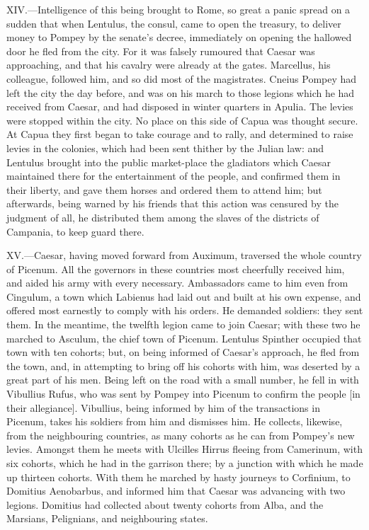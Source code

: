 XIV.—Intelligence of this being brought to Rome, so great a panic
spread on a sudden that when Lentulus, the consul, came to open the
treasury, to deliver money to Pompey by the senate's decree, immediately
on opening the hallowed door he fled from the city. For it was falsely
rumoured that Caesar was approaching, and that his cavalry were already
at the gates. Marcellus, his colleague, followed him, and so did most of
the magistrates. Cneius Pompey had left the city the day before, and was
on his march to those legions which he had received from Caesar, and had
disposed in winter quarters in Apulia. The levies were stopped within
the city. No place on this side of Capua was thought secure. At Capua
they first began to take courage and to rally, and determined to raise
levies in the colonies, which had been sent thither by the Julian law:
and Lentulus brought into the public market-place the gladiators which
Caesar maintained there for the entertainment of the people, and
confirmed them in their liberty, and gave them horses and ordered them
to attend him; but afterwards, being warned by his friends that this
action was censured by the judgment of all, he distributed them among
the slaves of the districts of Campania, to keep guard there.

XV.—Caesar, having moved forward from Auximum, traversed the whole
country of Picenum. All the governors in these countries most cheerfully
received him, and aided his army with every necessary. Ambassadors came
to him even from Cingulum, a town which Labienus had laid out and built
at his own expense, and offered most earnestly to comply with his
orders. He demanded soldiers: they sent them. In the meantime, the
twelfth legion came to join Caesar; with these two he marched to
Asculum, the chief town of Picenum. Lentulus Spinther occupied that town
with ten cohorts; but, on being informed of Caesar's approach, he fled
from the town, and, in attempting to bring off his cohorts with him, was
deserted by a great part of his men. Being left on the road with a small
number, he fell in with Vibullius Rufus, who was sent by Pompey into
Picenum to confirm the people [in their allegiance]. Vibullius, being
informed by him of the transactions in Picenum, takes his soldiers from
him and dismisses him. He collects, likewise, from the neighbouring
countries, as many cohorts as he can from Pompey's new levies. Amongst
them he meets with Ulcilles Hirrus fleeing from Camerinum, with six
cohorts, which he had in the garrison there; by a junction with which he
made up thirteen cohorts. With them he marched by hasty journeys to
Corfinium, to Domitius Aenobarbus, and informed him that Caesar was
advancing with two legions. Domitius had collected about twenty cohorts
from Alba, and the Marsians, Pelignians, and neighbouring states.

